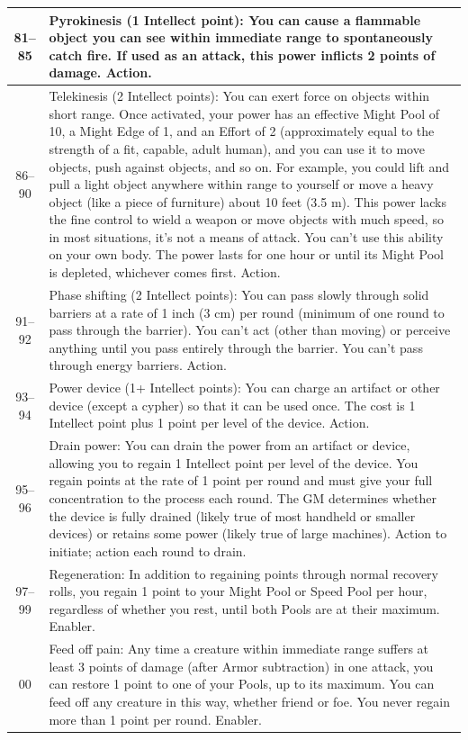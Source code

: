 \begin{longtable}{| c | p{15cm} |}
 81–85 & Pyrokinesis (1 Intellect point): You can cause a flammable object you can see within immediate range to spontaneously catch fire. If used as an attack, this power inflicts 2 points of damage. Action. \\ \hline
 86–90 & Telekinesis (2 Intellect points): You can exert force on objects within short range. Once activated, your power has an effective Might Pool of 10, a Might Edge of 1, and an Effort of 2 (approximately equal to the strength of a fit, capable, adult human), and you can use it to move objects, push against objects, and so on. For example, you could lift and pull a light object anywhere within range to yourself or move a heavy object (like a piece of furniture) about 10 feet (3.5 m). This power lacks the fine control to wield a weapon or move objects with much speed, so in most situations, it’s not a means of attack. You can’t use this ability on your own body. The power lasts for one hour or until its Might Pool is depleted, whichever comes first. Action. \\ \hline
 91–92 & Phase shifting (2 Intellect points): You can pass slowly through solid barriers at a rate of 1 inch (3 cm) per round (minimum of one round to pass through the barrier). You can’t act (other than moving) or perceive anything until you pass entirely through the barrier. You can’t pass through energy barriers. Action. \\ \hline
 93–94 & Power device (1+ Intellect points): You can charge an artifact or other device (except a cypher) so that it can be used once. The cost is 1 Intellect point plus 1 point per level of the device. Action. \\ \hline
 95–96 & Drain power: You can drain the power from an artifact or device, allowing you to regain 1 Intellect point per level of the device. You regain points at the rate of 1 point per round and must give your full concentration to the process each round. The GM determines whether the device is fully drained (likely true of most handheld or smaller devices) or retains some power (likely true of large machines). Action to initiate; action each round to drain. \\ \hline
 97–99 & Regeneration: In addition to regaining points through normal recovery rolls, you regain 1 point to your Might Pool or Speed Pool per hour, regardless of whether you rest, until both Pools are at their maximum. Enabler. \\ \hline
 00 & Feed off pain: Any time a creature within immediate range suffers at least 3 points of damage (after Armor subtraction) in one attack, you can restore 1 point to one of your Pools, up to its maximum. You can feed off any creature in this way, whether friend or foe. You never regain more than 1 point per round. Enabler. \\ \hline
    
\end{longtable}

